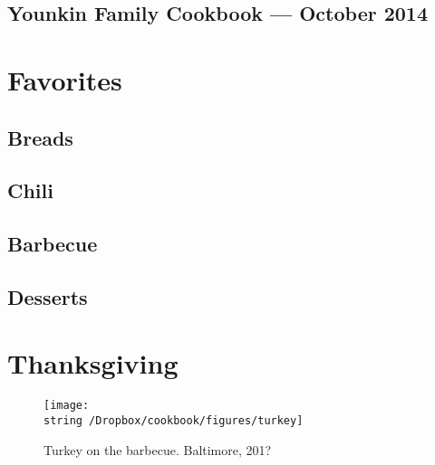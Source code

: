 \documentclass[12pt, final]{book}
\begin{document}
\frontmatter

\cleardoublepage
\section*{Younkin Family Cookbook --- October 2014}

\tableofcontents
\mainmatter

\chapter{Favorites}\label{chapter1}

\newpage

\newpage
\section{Breads}

\newpage

\newpage

\newpage
\section{Chili}

\newpage

\newpage

\newpage
\section{Barbecue}

\newpage

\newpage
\section{Desserts}

\newpage

\newpage

\newpage

\clearpage
\chapter{Thanksgiving}\label{chapter2}
\begin{figure}[h]
\begin{center}
\texttt{[image: \\string~/Dropbox/cookbook/figures/turkey]}
\end{center}
\caption*{Turkey on the barbecue. Baltimore, 201?}
\end{figure}
\newpage


\newpage

\newpage

\newpage

\newpage

\newpage

\newpage

\newpage
\end{document}

